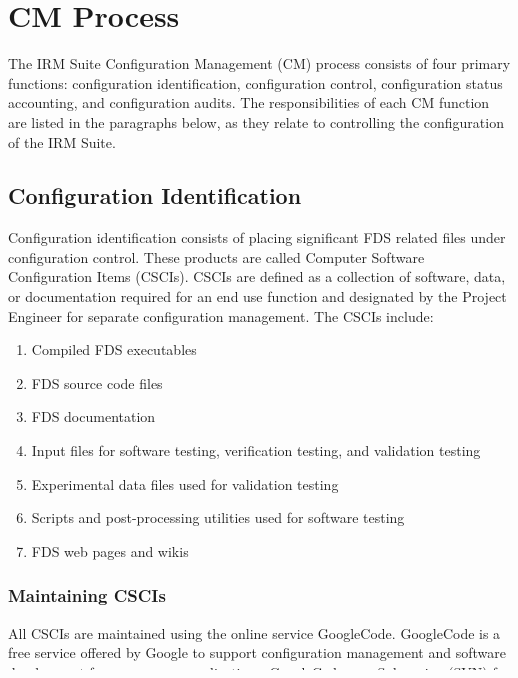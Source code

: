 \documentclass[11pt]{book}
\begin{document}
\chapter{CM Process}

The IRM Suite Configuration Management (CM) process consists of four primary functions: configuration
identification, configuration control, configuration status accounting, and configuration audits.
The responsibilities of each CM function are listed in the paragraphs below, as they relate to
controlling the configuration of the IRM Suite.

\section{Configuration Identification}

Configuration identification consists of placing significant FDS related files under configuration control.
These products are called Computer Software Configuration Items (CSCIs).  CSCIs are defined as a collection
of software, data, or documentation required for an end use function and designated by the Project Engineer
for separate configuration management.  The CSCIs include:

\begin{enumerate}

\item Compiled FDS executables
\item FDS source code files
\item FDS documentation
\item Input files for software testing, verification testing, and validation testing
\item Experimental data files used for validation testing
\item Scripts and post-processing utilities used for software testing
\item FDS web pages and wikis

\end{enumerate}

\subsection{Maintaining CSCIs}

All CSCIs are maintained using the online service GoogleCode.  GoogleCode is a free service offered by Google
to support configuration management and software development for open source applications.  GoogleCode uses 
Subversion (SVN) for revision control.  Under this system a centralized repository containing all CSCIs resides
on a GoogleCode server.  Versions are indentified by a version number which represents the version of the
entire repository rather than of a specific file (i.e. anytime a change is made to the repository all files are
incremented in version number).  A record of version number when a specific file was last changed is maintained.
\end{document}

